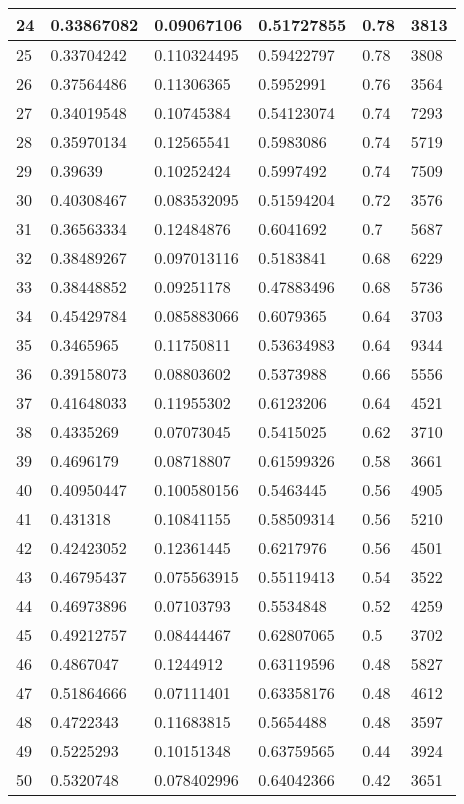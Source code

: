 \begin{longtable}{|l|l|l|l|l|l|}
24 & 0.33867082 & 0.09067106 & 0.51727855 & 0.78 & 3813 \\ \hline 
25 & 0.33704242 & 0.110324495 & 0.59422797 & 0.78 & 3808 \\ \hline 
26 & 0.37564486 & 0.11306365 & 0.5952991 & 0.76 & 3564 \\ \hline 
27 & 0.34019548 & 0.10745384 & 0.54123074 & 0.74 & 7293 \\ \hline 
28 & 0.35970134 & 0.12565541 & 0.5983086 & 0.74 & 5719 \\ \hline 
29 & 0.39639 & 0.10252424 & 0.5997492 & 0.74 & 7509 \\ \hline 
30 & 0.40308467 & 0.083532095 & 0.51594204 & 0.72 & 3576 \\ \hline 
31 & 0.36563334 & 0.12484876 & 0.6041692 & 0.7 & 5687 \\ \hline 
32 & 0.38489267 & 0.097013116 & 0.5183841 & 0.68 & 6229 \\ \hline 
33 & 0.38448852 & 0.09251178 & 0.47883496 & 0.68 & 5736 \\ \hline 
34 & 0.45429784 & 0.085883066 & 0.6079365 & 0.64 & 3703 \\ \hline 
35 & 0.3465965 & 0.11750811 & 0.53634983 & 0.64 & 9344 \\ \hline 
36 & 0.39158073 & 0.08803602 & 0.5373988 & 0.66 & 5556 \\ \hline 
37 & 0.41648033 & 0.11955302 & 0.6123206 & 0.64 & 4521 \\ \hline 
38 & 0.4335269 & 0.07073045 & 0.5415025 & 0.62 & 3710 \\ \hline 
39 & 0.4696179 & 0.08718807 & 0.61599326 & 0.58 & 3661 \\ \hline 
40 & 0.40950447 & 0.100580156 & 0.5463445 & 0.56 & 4905 \\ \hline 
41 & 0.431318 & 0.10841155 & 0.58509314 & 0.56 & 5210 \\ \hline 
42 & 0.42423052 & 0.12361445 & 0.6217976 & 0.56 & 4501 \\ \hline 
43 & 0.46795437 & 0.075563915 & 0.55119413 & 0.54 & 3522 \\ \hline 
44 & 0.46973896 & 0.07103793 & 0.5534848 & 0.52 & 4259 \\ \hline 
45 & 0.49212757 & 0.08444467 & 0.62807065 & 0.5 & 3702 \\ \hline 
46 & 0.4867047 & 0.1244912 & 0.63119596 & 0.48 & 5827 \\ \hline 
47 & 0.51864666 & 0.07111401 & 0.63358176 & 0.48 & 4612 \\ \hline 
48 & 0.4722343 & 0.11683815 & 0.5654488 & 0.48 & 3597 \\ \hline 
49 & 0.5225293 & 0.10151348 & 0.63759565 & 0.44 & 3924 \\ \hline 
50 & 0.5320748 & 0.078402996 & 0.64042366 & 0.42 & 3651 \\ \hline 
\end{longtable}